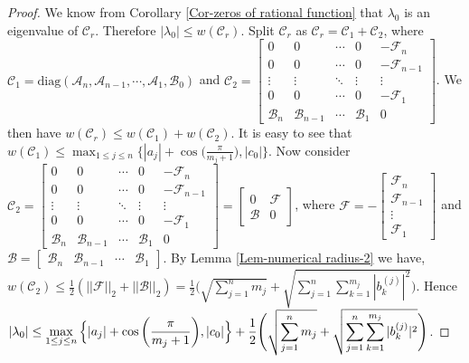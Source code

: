 \documentclass[12pt, reqno]{amsart}
\theoremstyle{definition}
\theoremstyle{remark}
\numberwithin{equation}{section}
\begin{document}
\begin{proof}
We know from Corollary \ref{Cor-zeros of rational function} that $\lambda_0$ is 
an eigenvalue of $\mathcal{C}_r$. Therefore 
$|\lambda_0| \leq w(\mathcal{C}_r)$. Split $\mathcal{C}_r$ as $\mathcal{C}_r 
= \mathcal{C}_1 + \mathcal{C}_2$, where $\mathcal{C}_1 = 
\text{diag}(\mathcal{A}_n,\mathcal{A}_{n-1}, \cdots , \mathcal{A}_1, \mathcal{B}_0)$  
and $\mathcal{C}_2 = \begin{bmatrix}
0 & 0 & \cdots & 0 & -\mathcal{F}_n \\
0 & 0 & \cdots & 0 & -\mathcal{F}_{n-1} \\
\vdots & \vdots & \ddots & \vdots & \vdots \\
0 & 0 & \cdots & 0 & -\mathcal{F}_1 \\
\mathcal{B}_n & \mathcal{B}_{n-1} & \cdots & \mathcal{B}_1 & 0
\end{bmatrix}$. We then have $w(\mathcal{C}_r) \leq w(\mathcal{C}_1) + 
w(\mathcal{C}_2)$. It is easy to see that $w(\mathcal{C}_1) \leq \displaystyle 
\max_{1 \leq j \leq n} \Big\{|a_j| + \cos\Big(\frac{\pi}{m_j+1}\Big), |c_0| \Big\}$. 
Now consider $\mathcal{C}_2 = \begin{bmatrix}
0 & 0 & \cdots & 0 & -\mathcal{F}_n \\
0 & 0 & \cdots & 0 & -\mathcal{F}_{n-1} \\
\vdots & \vdots & \ddots & \vdots & \vdots \\
0 & 0 & \cdots & 0 & -\mathcal{F}_1 \\
\mathcal{B}_n & \mathcal{B}_{n-1} & \cdots & \mathcal{B}_1 & 0
\end{bmatrix} = \begin{bmatrix}
0 & \mathcal{F} \\
\mathcal{B} & 0
\end{bmatrix}$, where $\mathcal{F} = -\begin{bmatrix}
\mathcal{F}_n \\
\mathcal{F}_{n-1} \\
\vdots \\
\mathcal{F}_1
\end{bmatrix}$ and $ \mathcal{B} = \begin{bmatrix}
\mathcal{B}_n & \mathcal{B}_{n-1} & \cdots & \mathcal{B}_1
\end{bmatrix}$. By Lemma \ref{Lem-numerical radius-2} we have, $w(\mathcal{C}_2) 
\leq \displaystyle \frac{1}{2} (||\mathcal{F}||_2+ ||\mathcal{B}||_2) = \frac{1}{2} 
\Bigg( \sqrt{\sum _{j=1}^{n}m_j} + \sqrt{\sum_{j=1}^{n} 
\sum_{k=1}^{m_j}|b_k^{(j)}|^2} \Bigg)$. Hence $|\lambda_0| \leq \displaystyle 
\max_{1 \leq j \leq n} \Big\{|a_j| + \cos\bigg(\frac{\pi}{m_j+1}\bigg), |c_0| \Big\}\\
 + \frac{1}{2} \Bigg( \sqrt{\sum _{j=1}^{n}m_j} + \sqrt{\sum_{j=1}^{n} 
\sum_{k=1}^{m_j}|b_k^{(j)}|^2} \Bigg)$. 
\end{proof}
\end{document}
